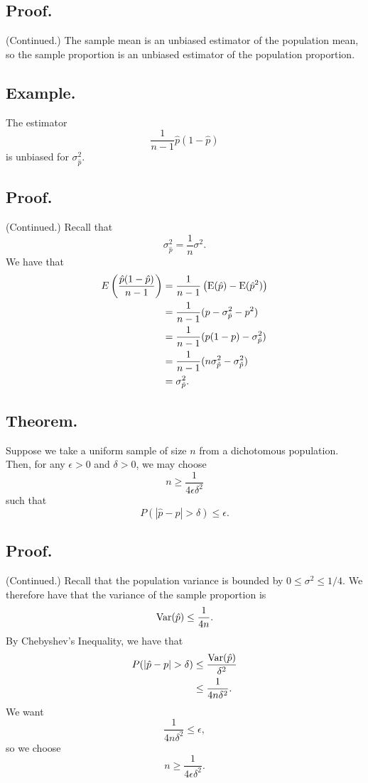 \documentclass[titlepage]{article}
\begin{document}
\subsection{Proof.} (Continued.) The sample mean is an unbiased estimator of the population mean, so the sample proportion is an unbiased estimator of the population proportion.

\subsection{Example.} The estimator 
$$\frac{1}{n-1}\hat{p}(1-\hat{p})$$
is unbiased for $\sigma_{\hat{p}}^{2}$.

\subsection{Proof.} (Continued.) Recall that 
$$\sigma_{\hat{p}}^{2} = \frac{1}{n}\sigma^{2}.$$
We have that 
\begin{align*}
    E\left(\frac{\hat{p}(1-\hat{p})}{n-1}\right) &= \frac{1}{n-1}\left(\text{E}(\hat{p}) - \text{E}(\hat{p}^{2})\right) \\
                                                 &= \frac{1}{n-1}(p - \sigma_{\hat{p}}^{2} - p^{2}) \\
                                                 &= \frac{1}{n-1}(p(1-p) - \sigma_{\hat{p}}^{2}) \\
                                                 &= \frac{1}{n-1}(n\sigma_{\hat{p}}^{2} - \sigma_{\hat{p}}^{2}) \\
                                                 &= \sigma_{\hat{p}}^{2}.
\end{align*}

\subsection{Theorem.} Suppose we take a uniform sample of size $n$ from a dichotomous population. Then, for any $\epsilon > 0$ and $\delta > 0$, we may choose 
$$n \geq \frac{1}{4\epsilon\delta^{2}}$$
such that 
$$P(|\hat{p} - p| > \delta) \leq \epsilon.$$

\subsection{Proof.} (Continued.) Recall that the population variance is bounded by $0 \leq \sigma^{2} \leq 1/4$. We therefore have that the variance of the sample proportion is 
$$\text{Var}(\hat{p}) \leq \frac{1}{4n}.$$
By Chebyshev's Inequality, we have that 
\begin{align*}
    P(|\hat{p} - p| > \delta) &\leq \frac{\text{Var}(\hat{p})}{\delta^{2}} \\
                              &\leq \frac{1}{4n\delta^{2}}.
\end{align*}
We want 
$$\frac{1}{4n\delta^{2}} \leq \epsilon,$$
so we choose 
$$n \geq \frac{1}{4\epsilon\delta^{2}}.$$
\end{document}
